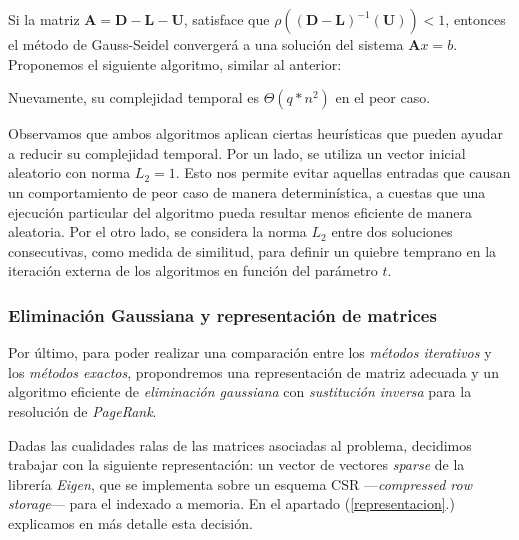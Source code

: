 \vspace{1em}
Si la matriz $\mathbf{A} = \mathbf{D} - \mathbf{L} - \mathbf{U}$, satisface que $\rho((\mathbf{D} - \mathbf{L})^{-1}(\mathbf{U})) < 1$, entonces el método de Gauss-Seidel convergerá a una solución del sistema $\mathbf{A}x = b$. Proponemos el siguiente algoritmo, similar al anterior:

\vspace{1em}


\vspace{1em}
\noindent Nuevamente, su complejidad temporal es $\Theta(q * n^2)$ en el peor caso.

\vspace{1em}
Observamos que ambos algoritmos aplican ciertas heurísticas que pueden ayudar a reducir su complejidad temporal. Por un lado, se utiliza un vector inicial aleatorio con norma $L_2 = 1$. Esto nos permite evitar aquellas entradas que causan un comportamiento de peor caso de manera determinística, a cuestas que una ejecución particular del algoritmo pueda resultar menos eficiente de manera aleatoria. Por el otro lado, se considera la norma $L_2$ entre dos soluciones consecutivas, como medida de similitud, para definir un quiebre temprano en la iteración externa de los algoritmos en función del parámetro $t$. 




\vspace{2em}
\subsubsection{Eliminación Gaussiana y representación de matrices}

Por último, para poder realizar una comparación entre los \textit{métodos iterativos} y los \textit{métodos exactos}, propondremos una representación de matriz adecuada y un algoritmo eficiente de \textit{eliminación gaussiana} con \textit{sustitución inversa} para la resolución de \textit{PageRank}.

\vspace{1em}
Dadas las cualidades ralas de las matrices asociadas al problema, decidimos trabajar con la siguiente representación: un vector de vectores \textit{sparse} de la librería \textit{Eigen}, que se implementa sobre un esquema CSR ---\textit{compressed row storage}--- para el indexado a memoria. En el apartado (\ref{representacion}.) explicamos en más detalle esta decisión.

